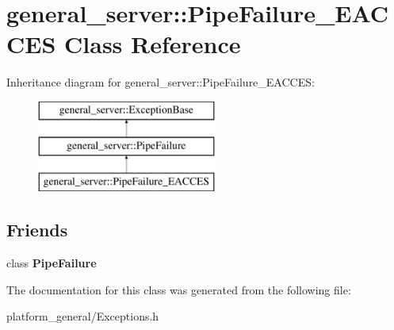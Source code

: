 \hypertarget{classgeneral__server_1_1PipeFailure__EACCES}{\section{general\-\_\-server\-:\-:\-Pipe\-Failure\-\_\-\-E\-A\-C\-C\-E\-S \-Class \-Reference}
\label{classgeneral__server_1_1PipeFailure__EACCES}
}
\-Inheritance diagram for general\-\_\-server\-:\-:\-Pipe\-Failure\-\_\-\-E\-A\-C\-C\-E\-S\-:\begin{figure}[H]
\begin{center}
\leavevmode
\includegraphics[height=3.000000cm]{classgeneral__server_1_1PipeFailure__EACCES}
\end{center}
\end{figure}
\subsection*{\-Friends}
\begin{DoxyCompactItemize}
\item 
\hypertarget{classgeneral__server_1_1PipeFailure__EACCES_a6b35978698e89f7e3f63b6db5a5366b6}{class {\bfseries \-Pipe\-Failure}}\label{classgeneral__server_1_1PipeFailure__EACCES_a6b35978698e89f7e3f63b6db5a5366b6}

\end{DoxyCompactItemize}


\-The documentation for this class was generated from the following file\-:\begin{DoxyCompactItemize}
\item 
platform\-\_\-general/\-Exceptions.\-h\end{DoxyCompactItemize}
